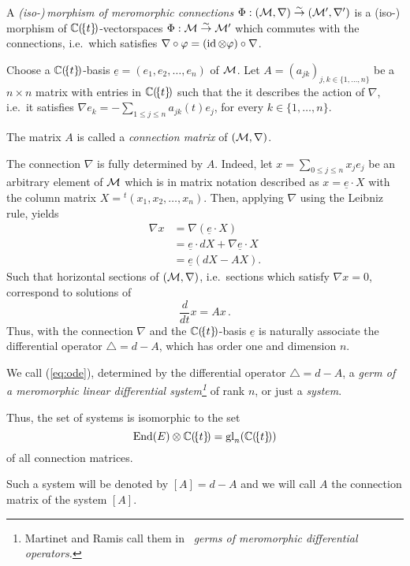 \begin{defn}
  A \emph{(iso-)\,morphism of meromorphic connections}
  $\Phi:(\mathcal{M},\nabla)\overset{\sim}\to(\mathcal{M}',\nabla')$ is a (iso-)\,morphism of
  $\mathbb{C}(\!\{t\}\!)$-vectorspaces $\Phi:\mathcal{M}\overset{\sim}\to\mathcal{M}'$ which commutes
  with the connections, i.e.\ which satisfies
  $\nabla\circ\varphi = (\operatorname{id}\otimes\varphi)\circ\nabla$.
\end{defn}
Choose a $\mathbb{C}(\!\{t\}\!)$-basis $\underline{e}=(e_1,e_2,\dots,e_n)$ of $\mathcal{M}$.
Let $A=(a_{jk})_{j,k\in\{1,\dots,n\}}$ be a $n\times n$ matrix with entries in
$\mathbb{C}(\!\{t\}\!)$ such that the it describes the action of $\nabla$, i.e.\ it
satisfies $\nabla e_k=-\sum_{1\leq j\leq n} a_{jk}(t)e_j$, for every
$k\in\{1,\dots,n\}$.
\begin{defn}
  The matrix $A$ is called a \emph{connection matrix} of $(\mathcal{M},\nabla)$.
\end{defn}
The connection $\nabla$ is fully determined by $A$. Indeed, let
$x=\sum_{0\leq j\leq n}x_je_j$ be an arbitrary element of $\mathcal{M}$ which is in
matrix notation described as $x=\underline{e}\cdot X$ with the column matrix
$X={}^t\!(x_1,x_2 ,\dots,x_n)$.
Then, applying $\nabla$ using the Leibniz rule, yields
\begin{align*}
  \nabla x&=\nabla\left(\underline{e}\cdot X\right)
  \\&=\underline{e} \cdot dX + \nabla \underline{e} \cdot X
  \\&=\underline{e}\left(dX-AX\right).
\end{align*}
Such that horizontal sections of $(\mathcal{M},\nabla)$, i.e.\ sections which satisfy
$\nabla x=0$, correspond to solutions of
\begin{equation}\label{eq:ode}
  \frac{d}{dt}x=Ax \,.
\end{equation}
Thus, with the connection $\nabla$ and the $\mathbb{C}(\!\{t\}\!)$-basis
$\underline{e}$ is naturally associate the differential operator
$\triangle=d-A$, which has order one and dimension $n$.
\begin{defn}
  We call (\ref{eq:ode}), determined by the differential operator
  $\triangle=d-A$, a \emph{germ of a meromorphic linear differential
  system\footnote{Martinet and Ramis call them in~\cite{Martinet1991}
  \emph{germs of meromorphic differential operators.}}} of rank $n$, or just a
  \emph{system}.
  \begin{s-prop}
    Thus, the set of systems is isomorphic to the set
    \[
      \operatorname{End}(E)\otimes\mathbb{C}(\!\{t\}\!)=\operatorname{gl}_n(\mathbb{C}(\!\{t\}\!))
    \]
    of all connection matrices.
  \end{s-prop}
  Such a system will be denoted by $[A]=d-A$ and we will call $A$ the
  connection matrix of the system $[A]$.
\end{defn}

